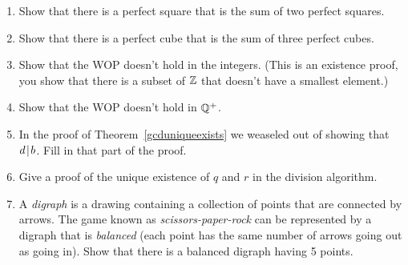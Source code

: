 \begin{enumerate}
\item Show that there is a perfect square that is the sum of two
perfect squares.


\wbvfill

\item Show that there is a perfect cube that is the sum of three
perfect cubes.


\wbvfill

\workbookpagebreak

\item Show that the WOP doesn't hold in the integers.  (This is an
existence proof, you show that there is a subset of ${\mathbb Z}$
that doesn't have a smallest element.)


\wbvfill

\item Show that the WOP doesn't hold in ${\mathbb Q}^+$.


\wbvfill

\workbookpagebreak

\item In the proof of Theorem~\ref{gcduniqueexists} we weaseled out of
showing that $d \!\mid\! b$.  Fill in that part of the proof.


\wbvfill

\item Give a proof of the unique existence of $q$ and $r$ in the
division algorithm. 


\wbvfill

\workbookpagebreak

\item A \emph{digraph} is a drawing containing a collection of points
that are connected by arrows.  The game known as \emph{scissors-paper-rock}
can be represented by a digraph that is \emph{balanced} (each point has the
same number of arrows going out as going in).  Show that there is a 
balanced digraph having 5 points.

\begin{center}

\end{center}
  

\wbvfill

\workbookpagebreak

\end{enumerate}
